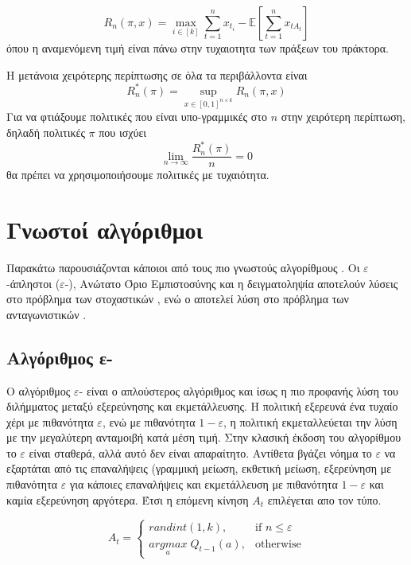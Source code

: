 \begin{equation}
    R_n(π,x) = \max_{i \in [k]} \sum_{t=1}^n x_{t_i} - \mathbb{E}\left[\sum_{t=1}^n x_{tA_t}\right]
\end{equation}
όπου η αναμενόμενη τιμή είναι πάνω στην τυχαιοτητα των πράξεων του πράκτορα.

Η μετάνοια χειρότερης περίπτωσης σε όλα τα περιβάλλοντα είναι
\begin{equation*}
    R_n^*(π) =  \sup_{x \in [0,1]^{n \times k}} R_n(π,x)
\end{equation*}
Για να φτιάξουμε πολιτικές που είναι υπο-γραμμικές στο $n$ στην χειρότερη περίπτωση, δηλαδή πολιτικές $π$ που ισχύει
\begin{equation*}
    \lim_{n \to \infty} \frac{R^*_n(π)}{n} = 0
\end{equation*}
θα πρέπει να χρησιμοποιήσουμε πολιτικές με τυχαιότητα.

\section{Γνωστοί αλγόριθμοι}

Παρακάτω παρουσιάζονται κάποιοι από τους πιο γνωστούς αλγορίθμους . Οι $ε$-άπληστοι ($ε$-), Ανώτατο Όριο Εμπιστοσύνης  και η δειγματοληψία  αποτελούν λύσεις στο πρόβλημα των στοχαστικών , ενώ ο  αποτελεί λύση στο πρόβλημα των ανταγωνιστικών .

\subsection{Αλγόριθμος ε-}

Ο αλγόριθμος $ε$- είναι ο απλούστερος αλγόριθμος και ίσως η πιο προφανής λύση του διλήμματος μεταξύ εξερεύνησης και εκμετάλλευσης. Η πολιτική εξερευνά ένα τυχαίο χέρι με πιθανότητα $ε$, ενώ με πιθανότητα $1-ε$, η πολιτική εκμεταλλεύεται την λύση με την μεγαλύτερη ανταμοιβή κατά μέση τιμή. Στην κλασική έκδοση του αλγορίθμου το $ε$ είναι σταθερά, αλλά αυτό δεν είναι απαραίτητο. Αντίθετα βγάζει νόημα το $ε$ να εξαρτάται από τις επαναλήψεις (γραμμική μείωση, εκθετική μείωση, εξερεύνηση με πιθανότητα $ε$ για κάποιες επαναλήψεις και εκμετάλλευση με πιθανότητα $1-ε$ και καμία εξερεύνηση αργότερα. Έτσι η επόμενη κίνηση $A_t$ επιλέγεται απο τον τύπο.

\begin{otherlanguage}{english}
    \begin{equation*}
        A_t = \begin{cases}
            randint(1,k),                     & \text{if } n \leq ε \\
            \underset{a}{argmax}\;Q_{t-1}(a), & \text{otherwise}
        \end{cases}
    \end{equation*}
\end{otherlanguage}


